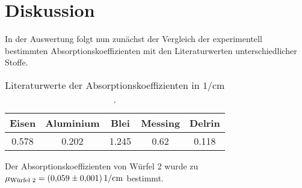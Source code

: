 \newpage
\section{Diskussion}

In der Auswertung folgt nun zunächst der Vergleich der experimentell bestimmten Absorptionskoeffizienten mit den Literaturwerten unterschiedlicher Stoffe.

\begin{table}
    \centering
    \begin{tabular}{c c c c c}
    \toprule
    Eisen & Aluminium & Blei & Messing & Delrin\\
     \midrule 
    0.578 & 0.202 & 1.245 & 0.62 & 0.118\\
\bottomrule
\end{tabular}
\caption{Literaturwerte der Absorptionskoeffizienten in $\si{1\per\centi\metre}$ \cite{chemie} \cite{delrin}.}
\label{tab:lit}
\end{table}

\noindent Der Absorptionskoeffizienten von Würfel 2 wurde zu $\mu_\t{Würfel 2} = \SI{0.059(0001)}{1\per\centi\metre}$ bestimmt.
